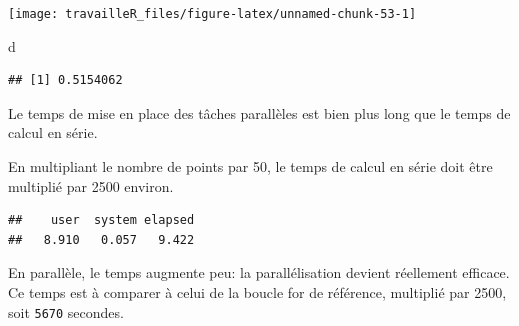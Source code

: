 \documentclass[
  12pt,
  french,
  a4paper,
  extrafontsizes,onecolumn,openright
  ]{memoir}
\newenvironment{Shaded}{\begin{snugshade}}{\end{snugshade}}
\newcommand{\DecValTok}[1]{\textcolor[rgb]{0.00,0.00,0.81}{#1}}
\newcommand{\KeywordTok}[1]{\textcolor[rgb]{0.13,0.29,0.53}{\textbf{#1}}}
\newcommand{\NormalTok}[1]{#1}
\newcommand{\OperatorTok}[1]{\textcolor[rgb]{0.81,0.36,0.00}{\textbf{#1}}}
\newcommand{\StringTok}[1]{\textcolor[rgb]{0.31,0.60,0.02}{#1}}
\begin{document}
\begin{center}\texttt{[image: travailleR\_files/figure-latex/unnamed-chunk-53-1]} \end{center}

\begin{Shaded}
\begin{Highlighting}[]
\NormalTok{d}
\end{Highlighting}
\end{Shaded}

\begin{verbatim}
## [1] 0.5154062
\end{verbatim}

\normalsize

Le temps de mise en place des tâches parallèles est bien plus long que le temps de calcul en série.

En multipliant le nombre de points par 50, le temps de calcul en série doit être multiplié par 2500 environ.

\scriptsize

\begin{Shaded}
\end{Shaded}

\begin{verbatim}
##    user  system elapsed 
##   8.910   0.057   9.422
\end{verbatim}

\normalsize

En parallèle, le temps augmente peu: la parallélisation devient réellement efficace.
Ce temps est à comparer à celui de la boucle for de référence, multiplié par 2500, soit \texttt{5670} secondes.

\scriptsize

\begin{Shaded}
\end{Shaded}
\end{document}
